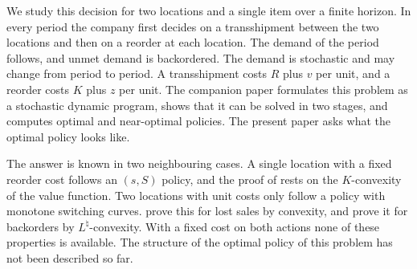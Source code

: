 \documentclass[11pt]{article}
\theoremstyle{definition}
\begin{document}
We study this decision for two locations and a single item over a finite horizon. In every period the company first decides on a transshipment between the two locations and then on a reorder at each location. The demand of the period follows, and unmet demand is backordered. The demand is stochastic and may change from period to period. A transshipment costs $R$ plus $v$ per unit, and a reorder costs $K$ plus $z$ per unit. The companion paper \citep{ma2026computational} formulates this problem as a stochastic dynamic program, shows that it can be solved in two stages, and computes optimal and near-optimal policies. The present paper asks what the optimal policy looks like.

The answer is known in two neighbouring cases. A single location with a fixed reorder cost follows an $(s,S)$ policy, and the proof of \citet{scarf1959optimality} rests on the $K$-convexity of the value function. Two locations with unit costs only follow a policy with monotone switching curves. \citet{abouee2015optimal} prove this for lost sales by convexity, and \citet{xu2023optimal} prove it for backorders by $L^{\natural}$-convexity. With a fixed cost on both actions none of these properties is available. The structure of the optimal policy of this problem has not been described so far.
\end{document}
